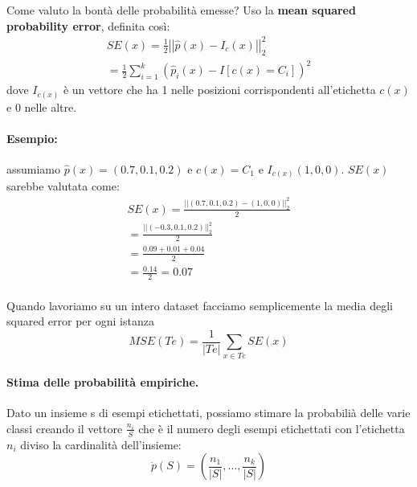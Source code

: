 Come valuto la bontà delle probabilità emesse? Uso la \textbf{mean squared probability error}, definita così:
\begin{equation}
\begin{split}
    SE(x)=\frac{1}{2}\left|\left| \hat{p}(x)-I_c(x) \right|\right|_2^2 \\
    = \frac{1}{2} \sum_{i=1}^k(\hat{p}_i(x)-I[c(x)=C_i])^2
\end{split}
\end{equation}
dove $I_{c(x)}$ è un vettore che ha 1 nelle posizioni corrispondenti all'etichetta $c(x)$ e 0 nelle altre.

\paragraph{Esempio:}
assumiamo $\hat{p}(x)=(0.7,0.1,0.2)$ e $c(x)=C_1$ e $I_{c(x)}(1,0,0)$.
$SE(x)$ sarebbe valutata come:
\begin{equation}
    \begin{split}
        SE(x)=\frac{\left| \left| (0.7,0.1,0.2)-(1,0,0) \right| \right|_{2}^{2}}{2} \\
        =\frac{\left| \left| (-0.3,0.1,0.2) \right| \right|_{2}^{2}}{2} \\
        =\frac{0.09+0.01+0.04}{2} \\
        =\frac{0.14}{2}=0.07
    \end{split}
\end{equation}

\paragraph{}Quando lavoriamo su un intero dataset facciamo semplicemente la media degli squared error per ogni istanza
\begin{equation}
     MSE(Te)=\frac{1}{\left|Te \right|}\sum_{x\in Te}SE(x)
\end{equation}

\paragraph{Stima delle probabilità empiriche.} Dato un insieme s di esempi etichettati, possiamo stimare la probabilià delle varie classi creando il vettore $\frac{n_i}{S}$ che è il numero degli esempi etichettati con l'etichetta $n_i$ diviso la cardinalità dell'insieme:
\begin{equation}
    \dot{p}(S)=\left(\frac{n_1}{|S|},\dots,\frac{n_k}{|S|}\right)
\end{equation}

